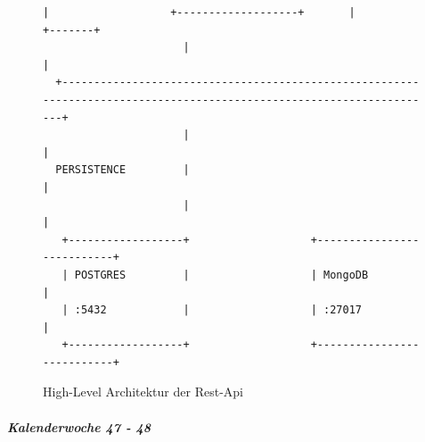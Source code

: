 \documentclass[12pt]{article}
\begin{document}
\begin{figure}[h!]
\begin{Verbatim}[fontsize=\tiny,frame=single]
                      |                   +-------------------+       |                                          +-------+
                      |                                               |
  +----------------------------------------------------------------------------------------------------------------------+
                      |                                               |
  PERSISTENCE         |                                               |
                      |                                               |
   +------------------+                   +---------------------------+
   | POSTGRES         |                   | MongoDB                   |
   | :5432            |                   | :27017                    |
   +------------------+                   +---------------------------+
  \end{Verbatim}


  \caption{High-Level Architektur der Rest-Api}
  \label{}
\end{figure}

\subparagraph{Kalenderwoche 47 - 48}\mbox{}\\
\end{document}
